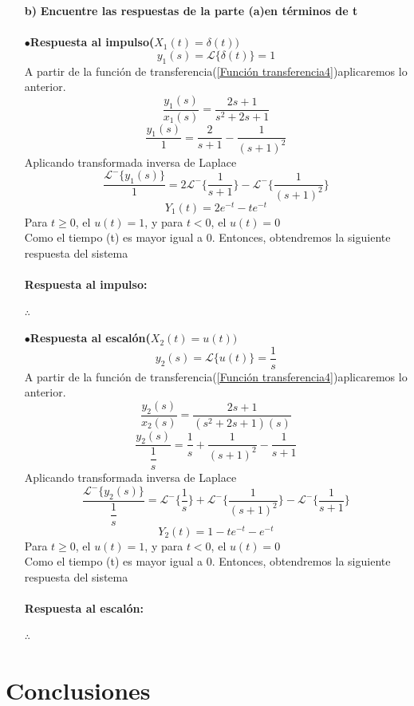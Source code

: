 \documentclass[11pt,a4paper]{article}
\begin{document}
{{\begin{enumerate}
	\item[\textbf{b)}]
	\textbf{Encuentre las respuestas de la parte (a)en términos de t}\\\\
	$\bullet$\textbf{Respuesta al impulso($X_1(t)=\delta (t))$}\\
	$$y_1(s)=\mathcal{L}{\lbrace \delta (t) \rbrace}=1$$
	A partir de la función de transferencia(\ref{Función transferencia4})aplicaremos lo anterior.
	$$\dfrac{y_1(s)}{x_1(s)}=\dfrac{2s+1}{s^2 +2s+1}$$
	$$\dfrac{y_1(s)}{1}=\dfrac{2}{s+1}-\dfrac{1}{(s+1)^2}$$
	Aplicando transformada inversa de Laplace
	$$\dfrac{\mathcal{L^{-}}{\lbrace y_1(s)\rbrace }}{1}=2 \mathcal{L^{-}}{\lbrace \dfrac{1}{s+1} \rbrace } -\mathcal{L^{-}}{\lbrace \dfrac{1}{(s+1)^2}\rbrace}$$
	$$Y_1(t)=2e^{-t}-te^{-t}$$
	Para $t \geq 0$, el $u(t)=1$, y para  $t < 0$, el $u(t)=0$\\
	Como el tiempo (t) es  mayor igual a 0. Entonces, obtendremos la siguiente respuesta del sistema\\\\
	\textbf{Respuesta al impulso:}
	\begin{center}
	$\therefore$ 
	\end{center}
	
	$\bullet$\textbf{Respuesta al escalón($X_2(t)= u(t))$}\\
	$$y_2(s)=\mathcal{L}{\lbrace u(t) \rbrace}= \dfrac{1}{s}$$
	A partir de la función de transferencia(\ref{Función transferencia4})aplicaremos lo anterior.
	$$\dfrac{y_2(s)}{x_2(s)}= \dfrac{2s+1}{(s^2 +2s+1)(s)}$$
	$$ \dfrac{y_2(s)}{\dfrac{1}{s}}= \dfrac{1}{s}+ \dfrac{1}{(s+1)^2}- \dfrac{1}{s+1}$$
	Aplicando transformada inversa de Laplace
	$$\dfrac{\mathcal{L^{-}}{\lbrace y_2(s)\rbrace }}{\dfrac{1}{s}}= \mathcal{L^{-}}{\lbrace \dfrac{1}{s} \rbrace } +\mathcal{L^{-}}{\lbrace \dfrac{1}{(s+1)^2}\rbrace}-\mathcal{L^{-}}{\lbrace \dfrac{1}{s+1} \rbrace } $$
	$$Y_2(t)=1-te^{-t}-e^{-t}$$
	Para $t \geq 0$, el $u(t)=1$, y para  $t < 0$, el $u(t)=0$\\
	Como el tiempo (t) es  mayor igual a 0. Entonces, obtendremos la siguiente respuesta del sistema\\\\
	\textbf{Respuesta al escalón:}
	\begin{center}
	$\therefore$ 
	\end{center}
	\end{enumerate}
	}}
	\newpage
	\section{Conclusiones}{
	\large{
	
	}}
	
\end{document}
